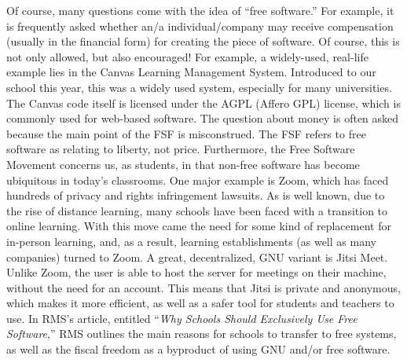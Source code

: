 \documentclass[12pt]{article}
\begin{document}
\begin{multicols}{3}
Of course, many questions come with the idea of “free software.” For example, it is frequently asked whether an/a individual/company may receive compensation (usually in the financial form) for creating the piece of software. Of course, this is not only allowed, but also encouraged! For example, a widely-used, real-life example lies in the Canvas Learning Management System. Introduced to our school this year, this was a widely used system, especially for many universities. The Canvas code itself is licensed under the AGPL (Affero GPL) license, which is commonly used for web-based software. The question about money is often asked because the main point of the FSF is misconstrued. The FSF refers to free software as relating to liberty, not price. Furthermore, the Free Software Movement concerns us, as students, in that non-free software has become ubiquitous in today's classrooms. One major example is Zoom, which has faced hundreds of privacy and rights infringement lawsuits. As is well known, due to the rise of distance learning, many schools have been faced with a transition to online learning. With this move came the need for some kind of replacement for in-person learning, and, as a result, learning establishments (as well as many companies) turned to Zoom. A great, decentralized, GNU variant is Jitsi Meet. Unlike Zoom, the user is able to host the server for meetings on their machine, without the need for an account. This means that Jitsi is private and anonymous, which makes it more efficient, as well as a safer tool for students and teachers to use. In RMS's article, entitled “\textit{Why Schools Should Exclusively Use Free Software},” RMS outlines the main reasons for schools to transfer to free systems, as well as the fiscal freedom as a byproduct of using GNU and/or free software. 


\end{multicols}
\end{document}
